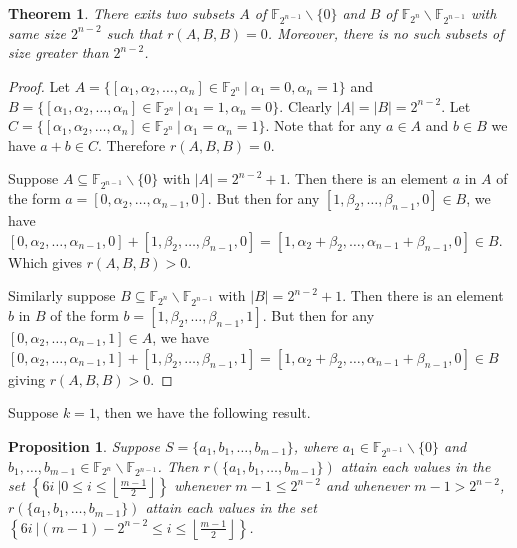 \documentclass[12pt,a4paper]{article}
\newtheorem{prop}{Proposition}[section]
\newtheorem{thm}{Theorem}[section]
\begin{document}
	\begin{thm}\label{ABB}
		There exits two subsets $A$ of $\mathbb{F}_{2^{n-1}}\backslash\{0\}$ and $B$ of $\mathbb{F}_{2^n}\backslash\mathbb{F}_{2^{n-1}}$ with same size $2^{n-2}$ such that $r(A,B,B)=0$. Moreover, there is no such subsets of size greater than $2^{n-2}$.
	\end{thm}
	\begin{proof}
		Let $A=\{[\alpha_1,\alpha_2,\dots,\alpha_n]\in\mathbb{F}_{2^n}~|~\alpha_1=0,\alpha_n=1\}$ and $B=\{[\alpha_1,\alpha_2,\dots,\alpha_n]\in\mathbb{F}_{2^n}~|~\alpha_1=1,\alpha_n=0\}$. Clearly $|A|=|B|=2^{n-2}$. Let $C=\{[\alpha_1,\alpha_2,\dots,\alpha_n]\in\mathbb{F}_{2^n}~|~\alpha_1=\alpha_n=1\}$. Note that for any $a\in A$ and $b\in B$ we have $a+b\in C$. Therefore $r(A,B,B)=0$. 
		
		Suppose $A\subseteq\mathbb{F}_{2^{n-1}}\backslash\{0\}$ with $|A|=2^{n-2}+1$. Then there is an element $a$ in $A$ of the form $a=[0,\alpha_2,\dots,\alpha_{n-1},0]$. But then for any $[1,\beta_2,\dots,\beta_{n-1},0]\in B$,  we have  $[0,\alpha_2,\dots,\alpha_{n-1},0]+[1,\beta_2,\dots,\beta_{n-1},0]=[1,\alpha_2+\beta_2,\dots,\alpha_{n-1}+\beta_{n-1},0]\in B$. Which gives $r(A,B,B)>0$.
		
		Similarly suppose $B\subseteq\mathbb{F}_{2^n}\backslash\mathbb{F}_{2^{n-1}}$ with $|B|=2^{n-2}+1$. Then there is an element $b$ in $B$ of the form $b=[1,\beta_2,\dots,\beta_{n-1},1]$. But then for any $[0,\alpha_2,\dots,\alpha_{n-1},1]\in A$,  we have  $[0,\alpha_2,\dots,\alpha_{n-1},1]+[1,\beta_2,\dots,\beta_{n-1},1]=[1,\alpha_2+\beta_2,\dots,\alpha_{n-1}+\beta_{n-1},0]\in B$ giving $r(A,B,B)>0$.
	\end{proof}
	Suppose $k=1$, then we have the following result. 
	\begin{prop}\label{k=1}
		Suppose $S=\{a_1,b_1,\dots,b_{m-1}\}$, where $a_1\in \mathbb{F}_{2^{n-1}}\backslash\{0\}$ and $b_1,\dots,b_{m-1}\in \mathbb{F}_{2^n}\backslash\mathbb{F}_{2^{n-1}}$.  Then $r(\{a_1,b_1,\dots,b_{m-1}\})$ attain each values in the set $\left\{6i~|0\leq i\leq \left\lfloor\frac{m-1}{2}\right\rfloor\right\}$ whenever $m-1\leq2^{n-2}$ and whenever $m-1>2^{n-2}$, $r(\{a_1,b_1,\dots,b_{m-1}\})$ attain each values in the set $\left\{6i~|(m-1)-2^{n-2}\leq i\leq \left\lfloor\frac{m-1}{2}\right\rfloor\right\}$.
	\end{prop}
\end{document}
